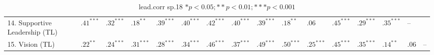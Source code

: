 \begin{table}[ht]
\begin{tabular}{llllllllllllllll}
  14. Supportive Leadership (TL) & $.41^{***}$ & $.32^{***}$ & $.18^{**}$ & $.39^{***}$ & $.40^{***}$ & $.42^{***}$ & $.40^{***}$ & $.39^{***}$ & $.18^{**}$ & $.06$ & $.45^{***}$ & $.29^{***}$ & $.35^{***}$ & -- &  \\ 
  15. Vision (TL) & $.22^{**}$ & $.24^{***}$ & $.31^{***}$ & $.28^{***}$ & $.34^{***}$ & $.46^{***}$ & $.37^{***}$ & $.49^{***}$ & $.50^{***}$ & $.25^{***}$ & $.45^{***}$ & $.35^{***}$ & $.14^{**}$ & $.06$ & -- \\ 
   \hline
\end{tabular}
\caption{lead.corr sp.18 $* p < 0.05; ** p < 0.01; *** p < 0.001$} 
\label{freq_corr.lead.corr.sp.18}
\end{table}
